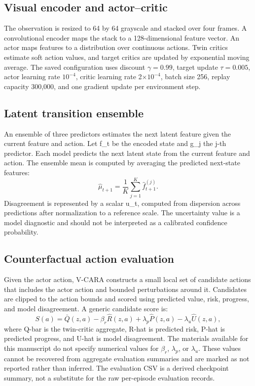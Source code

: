 \documentclass[11pt]{article}
\begin{document}
\subsection{Visual encoder and
actor--critic}\label{visual-encoder-and-actorcritic}

The observation is resized to 64 by 64 grayscale and stacked over four
frames. A convolutional encoder maps the stack to a 128-dimensional
feature vector. An actor maps features to a distribution over continuous
actions. Twin critics estimate soft action values, and target critics
are updated by exponential moving average. The saved configuration uses
discount \(\gamma=0.99\), target update \(\tau=0.005\), actor learning
rate \(10^{-4}\), critic learning rate 2\(\times\)\(10^{-4}\), batch size 256,
replay capacity 300,000, and one gradient update per environment step.

\subsection{Latent transition
ensemble}\label{latent-transition-ensemble}

An ensemble of three predictors estimates the next latent feature given
the current feature and action. Let f\_t be the encoded state and g\_j
the j-th predictor. Each model predicts the next latent state from the
current feature and action. The ensemble mean is computed by averaging
the predicted next-state features: \[
\hat{\mu}_{t+1}=\frac{1}{K}\sum_{j=1}^{K}\hat{f}_{t+1}^{(j)}.
\] Disagreement is represented by a scalar u\_t, computed from
dispersion across predictions after normalization to a reference scale.
The uncertainty value is a model diagnostic and should not be
interpreted as a calibrated confidence probability.

\subsection{Counterfactual action
evaluation}\label{counterfactual-action-evaluation}

Given the actor action, V-CARA constructs a small local set of candidate
actions that includes the actor action and bounded perturbations around
it. Candidates are clipped to the action bounds and scored using
predicted value, risk, progress, and model disagreement. A generic
candidate score is: \[
S(a)=\bar{Q}(z,a)-\beta_r\hat{R}(z,a)+\lambda_p\hat{P}(z,a)-\lambda_u\hat{U}(z,a),
\] where Q-bar is the twin-critic aggregate, R-hat is predicted risk,
P-hat is predicted progress, and U-hat is model disagreement. The materials available for this manuscript do not specify numerical values
for $\beta_r$, $\lambda_p$, or $\lambda_u$. These values cannot be
recovered from aggregate evaluation summaries and are marked as not reported
rather than inferred. The evaluation CSV is a derived checkpoint summary, not
a substitute for the raw per-episode evaluation records.
\end{document}
